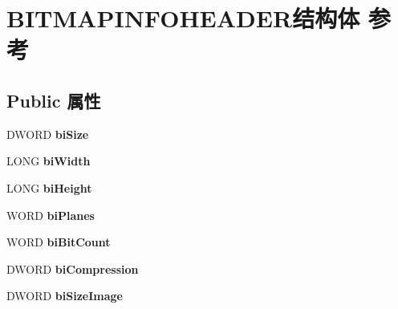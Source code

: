\hypertarget{struct_b_i_t_m_a_p_i_n_f_o_h_e_a_d_e_r}{}\section{B\+I\+T\+M\+A\+P\+I\+N\+F\+O\+H\+E\+A\+D\+E\+R结构体 参考}
\label{struct_b_i_t_m_a_p_i_n_f_o_h_e_a_d_e_r}
\subsection*{Public 属性}
\begin{DoxyCompactItemize}
\item 
\mbox{\label{struct_b_i_t_m_a_p_i_n_f_o_h_e_a_d_e_r_aa3eda9e52cd8fd84dcce1162f3a10890}} 
D\+W\+O\+RD {\bfseries bi\+Size}
\item 
\mbox{\label{struct_b_i_t_m_a_p_i_n_f_o_h_e_a_d_e_r_a12b20dd347e2335a599531f2c9fbf363}} 
L\+O\+NG {\bfseries bi\+Width}
\item 
\mbox{\label{struct_b_i_t_m_a_p_i_n_f_o_h_e_a_d_e_r_ab6956c967f4f4f5b17028827551a4593}} 
L\+O\+NG {\bfseries bi\+Height}
\item 
\mbox{\label{struct_b_i_t_m_a_p_i_n_f_o_h_e_a_d_e_r_ac2ad9da25ad2222375ffd1c6adac648b}} 
W\+O\+RD {\bfseries bi\+Planes}
\item 
\mbox{\label{struct_b_i_t_m_a_p_i_n_f_o_h_e_a_d_e_r_af9368c153e139bb6cf1a6483e1c14b31}} 
W\+O\+RD {\bfseries bi\+Bit\+Count}
\item 
\mbox{\label{struct_b_i_t_m_a_p_i_n_f_o_h_e_a_d_e_r_a245c45b905d9abf2a52fac3977686980}} 
D\+W\+O\+RD {\bfseries bi\+Compression}
\item 
\mbox{\label{struct_b_i_t_m_a_p_i_n_f_o_h_e_a_d_e_r_ac86e2e0d1da5a0f2b7a3447992336fbf}} 
D\+W\+O\+RD {\bfseries bi\+Size\+Image}
\item 
\mbox{\label{struct_b_i_t_m_a_p_i_n_f_o_h_e_a_d_e_r_a7557581e2890ebadbaf8193aa5107b9b}} 

\end{DoxyCompactItemize}
